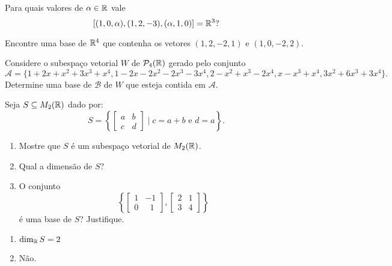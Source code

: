 \documentclass[12pt]{exam}
\begin{document}
    \begin{exercicio}
        Para quais valores de $\alpha \in \mathbb{R}$ vale
        \[
            [(1, 0, \alpha), (1, 2, -3) , (\alpha, 1, 0)] = \mathbb{R}^3?
        \]
    \end{exercicio}

    \begin{exercicio}
        Encontre uma base de $\mathbb{R}^4$ que contenha os vetores $(1,2,-2,1)$ e $(1,0,-2,2)$.
    \end{exercicio}

    \begin{exercicio}
        Considere o subespa\c{c}o vetorial $W$ de $\mathcal{P}_4(\mathbb{R})$ gerado pelo conjunto
        \[
            \mathcal{A} = \{1+2x+x^2+3x^3+x^4, 1-2x-2x^2-2x^3-3x^4,2-x^2+x^3-2x^4,x-x^3+x^4,3x^2+6x^3+3x^4\}.
        \]
        Determine uma base de $\mathcal{B}$ de $W$ que esteja contida em $\mathcal{A}$.
    \end{exercicio}

    \begin{exercicio}
        Seja $S \subseteq M_2(\mathbb{R})$ dado por:
        \[
            S = \left\{
                \begin{bmatrix}
                    a & b\\
                    c & d
                \end{bmatrix}
                \mid c = a+b \mbox{ e } d = a
            \right\}.
        \]

        \begin{enumerate}[label={\alph*})]
            \item Mostre que $S$ \'e um subespa\c{c}o vetorial de $M_2(\mathbb{R})$.

            \item Qual a dimens\~ao de $S$?

            \item O conjunto
                \[
                    \left\{
                        \begin{bmatrix}
                            1 & -1\\
                            0 & \phantom{x} 1
                        \end{bmatrix},
                        \begin{bmatrix}
                            2 & 1\\
                            3 & 4
                        \end{bmatrix}
                    \right\}
                \]
                \'e uma base de $S$? Justifique.
        \end{enumerate}

        \begin{solucao}
            \begin{enumerate}[label={\alph*})]
                \item $\dim_{\mathbb{R}} S = 2$

                \item N\~ao.
            \end{enumerate}
        \end{solucao}
    \end{exercicio}
\end{document}
